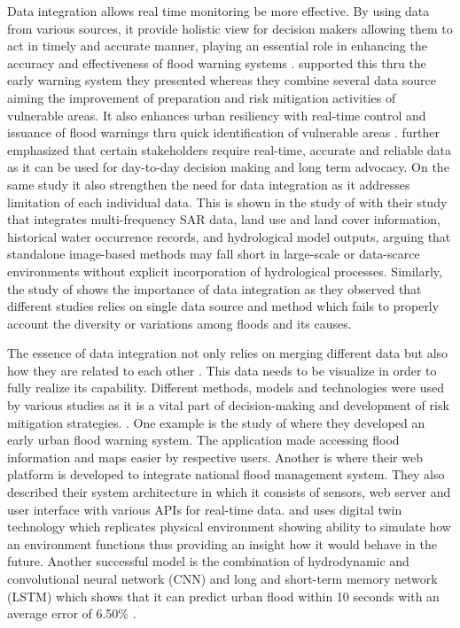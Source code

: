 \documentclass{research}
\begin{document}
Data integration allows real time monitoring be more effective. By using data from
various sources, it provide holistic view for decision makers allowing them to 
act in timely and accurate manner, playing an essential role in enhancing the accuracy
and effectiveness of flood warning systems \cite{song2024stateart}\cite{reinert_2025}\cite{Fan_Zeng_Pang_Wang_Wei_2025}. \cite{11089725} supported this
thru the early warning system they presented whereas they combine several data source
aiming the improvement of preparation and risk mitigation activities of vulnerable areas. 
It also enhances urban resiliency with real-time control and issuance of flood warnings \cite{w15010178}
thru quick identification of vulnerable areas \cite{Ragib2025}. \cite{FloodNet_2024} further emphasized
that certain stakeholders require real-time, accurate and reliable data as it can be used 
for day-to-day decision making and long term advocacy. On the same study it also strengthen the need for
data integration as it addresses limitation of each individual data. This is shown in the study of
\cite{ZHU2025134074} with their study that integrates 
multi-frequency SAR data, land use and land cover information, historical water 
occurrence records, and hydrological model outputs, arguing that standalone 
image-based methods may fall short in large-scale or data-scarce environments without 
explicit incorporation of hydrological processes. Similarly, the study of \cite{XU2025134243} shows
the importance of data integration as they observed that different studies
relies on single data source and method which fails to properly account the diversity or variations among
floods and its causes. 

The essence of data integration
not only relies on merging different data but also how they
are related to each other \cite{Hofmeistetal_2024}. This data needs to be visualize in order to 
fully realize its capability. Different methods, models and technologies were used 
by various studies as it is a vital part of decision-making and development of risk mitigation strategies.
\cite{LIU2025101960} \cite{Akinsoji_Adelodun_Adeyi_Salau_Odey_Choi_2024} \cite{DiBacco_Molinari_Scorzini_2024}. One example is the study of \cite{DANG2025106246} where 
they developed an early urban flood warning system. The application made accessing flood information
and maps easier by respective users. Another is \cite{Basari_Alazzam_Abdirahim_Lah_Ahmad_Mustapha_2026}
where their web platform is developed to integrate national flood management system. They also 
described their system architecture in which it consists of sensors, web server and user interface with
various APIs for real-time data. \cite{rs17173104} and \cite{MCRAPALO2024131929} uses digital twin technology which
replicates physical environment showing ability to
simulate how an environment functions thus providing an insight how it would behave in the
future. Another successful model is the combination of hydrodynamic and convolutional neural network (CNN) and long and short-term memory network (LSTM)
which shows that it can predict urban flood within 10 seconds with an average
error of 6.50\% \cite{w15071397}.
\end{document}

